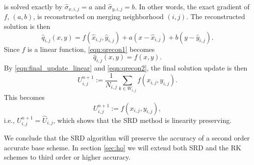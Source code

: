 is solved exactly by $\widehat{\sigma}_{x,i,j}=a$ and
$\widehat{\sigma}_{y,i,j}=b$.  In other words, the exact gradient 
of $f$, $(a,b)$, is reconstructed on merging neighborhood $(i,j)$.  
The reconstructed solution is then
\begin{equation}
    \label{eqn:qrecon1}
    \hat{q}_{i,j}(x,y) = f(\widehat{x}_{i,j},\widehat{y}_{i,j}) + a(x-\widehat{x}_{i,j})+b(y-\widehat{y}_{i,j}) .
\end{equation}
Since $f$ is a linear function, \eqref{eqn:qrecon1} becomes
\begin{equation}
    \label{eqn:qrecon2}
    \hat{q}_{i,j}(x,y) = f(x,y).
\end{equation}
By \eqref{eqn:final_update_linear} and \eqref{eqn:qrecon2}, the final solution update is then
\begin{equation} 
U^{n+1}_{i,j} := \frac{1}{N_{i,j}}\sum_{k \in W_{i,j}}f(x_{i,j},y_{i,j}).
\end{equation}
This becomes
\begin{equation} 
U^{n+1}_{i,j} := f(x_{i,j},y_{i,j}),
\end{equation}
i.e., $U^{n+1}_{i,j} = \widehat{U}_{i,j}$, which shows that the SRD method is linearity preserving.

We conclude that the SRD algorithm will preserve the accuracy of a second order accurate 
base scheme. In section \ref{sec:ho} we will extend both SRD and the RK
schemes to third order or higher accuracy.




